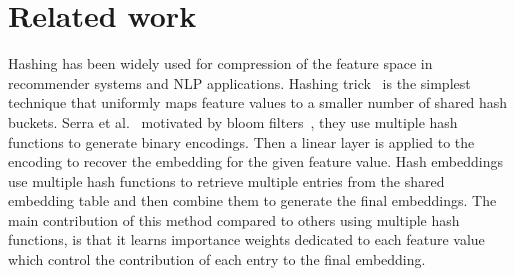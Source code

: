 \documentclass[conference]{IEEEtran}
\begin{document}




\section{Related work}
\label{rw}
Hashing has been widely used for compression of the feature space in recommender systems and NLP applications. Hashing trick~\cite{weinberger2009feature} is the simplest technique that uniformly maps feature values to a smaller number of shared hash buckets. 
Serra et al.~\cite{serra2017getting} motivated by bloom filters~\cite{bloom1970space}, they use multiple hash functions to generate binary encodings. Then a linear layer is applied to the encoding to recover the embedding for the given feature value.
% 
Hash embeddings~\cite{svenstrup2017hash} use multiple hash functions to retrieve multiple entries from the shared embedding table and then combine them to generate the final embeddings.
The main contribution of this method compared to others using multiple hash functions, is that it learns importance weights dedicated to each feature value which control the contribution of each entry to the final embedding.
\end{document}
